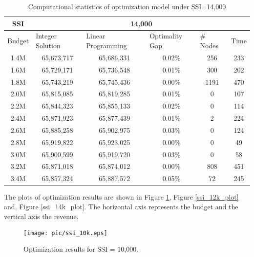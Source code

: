 \documentclass[12pt,english]{report}
\begin{document}
\begin{table}[H]
\centering
\caption{Computational statistics of optimization model under SSI=14,000}
\label{ssi14k}
\begin{tabular}{|c|c|c|c|c|c|}
\hline \hline 
SSI     & \multicolumn{5}{c|}{14,000}                      
\\ \hline
\multicolumn{1}{|l|}{Budget} & \multicolumn{1}{l|}{Integer Solution} &
\multicolumn{1}{l|}{Linear Programming} & \multicolumn{1}{l|}{Optimality Gap} &
\multicolumn{1}{l|}{\# Nodes} & \multicolumn{1}{l|}{Time} \\
\hline
1.4M    & 65,673,717     & 65,686,331 & 0.02\%       & 256    &233                \\ \hline
1.6M   & 65,729,171  & 65,736,548 & 0.01\%   & 300     &202                    \\ \hline
1.8M   & 65,743,219   & 65,745,436 & 0.00\%       & 1191   & 470                \\ \hline
2.0M  & 65,815,085   & 65,819,285 & 0.01\%   & 0  & 107                        \\ \hline
2.2M   & 65,844,323   & 65,855,133 & 0.02\%     & 0  & 114                      \\ \hline
2.4M   & 65,871,923   & 65,877,439 & 0.01\%     & 2   & 224                     \\ \hline
2.6M      & 65,885,258     & 65,902,975 & 0.03\%     & 0       & 124                 \\ \hline
2.8M   & 65,919,822      & 65,923,025 & 0.00\%   & 0      & 49                     \\ \hline
3.0M    & 65,900,599    & 65,919,720 & 0.03\%   & 0    & 58                       \\ \hline
3.2M  & 65,871,018    & 65,874,012 & 0.00\%  & 808    & 451                     \\ \hline
3.4M      & 65,857,324     & 65,887,572 & 0.05\%   & 72    & 245                     \\ \hline
\end{tabular}
\end{table}

The plots of optimization results are shown in Figure \ref{ssi_10k_plot}, Figure \ref{ssi_12k_plot} and, Figure \ref{ssi_14k_plot}. The horizontal axis represents the budget and the vertical axis the revenue. 


\begin{figure}[ht]
    \centering
    \texttt{[image: pic/ssi\_10k.eps]}
    \caption{Optimization results for SSI = 10,000. }
     \label{ssi_10k_plot}
\end{figure}
\end{document}

